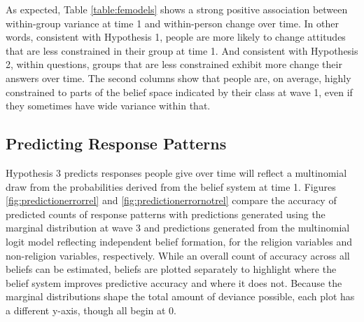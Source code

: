 \documentclass[12pt,]{article}
\begin{document}
As expected, Table \ref{table:femodels} shows a strong positive association between within-group variance at time 1 and within-person change over time. In other words, consistent with Hypothesis 1, people are more likely to change attitudes that are less constrained in their group at time 1. And consistent with Hypothesis 2, within questions, groups that are less constrained exhibit more change their answers over time. The second columns show that people are, on average, highly constrained to parts of the belief space indicated by their class at wave 1, even if they sometimes have wide variance within that.

\hypertarget{predicting-response-patterns}{%
\subsection{Predicting Response Patterns}\label{predicting-response-patterns}}

Hypothesis 3 predicts responses people give over time will reflect a multinomial draw from the probabilities derived from the belief system at time 1. Figures \ref{fig:predictionerrorrel} and \ref{fig:predictionerrornotrel} compare the accuracy of predicted counts of response patterns with predictions generated using the marginal distribution at wave 3 and predictions generated from the multinomial logit model reflecting independent belief formation, for the religion variables and non-religion variables, respectively. While an overall count of accuracy across all beliefs can be estimated, beliefs are plotted separately to highlight where the belief system improves predictive accuracy and where it does not. Because the marginal distributions shape the total amount of deviance possible, each plot has a different y-axis, though all begin at 0.
\end{document}
